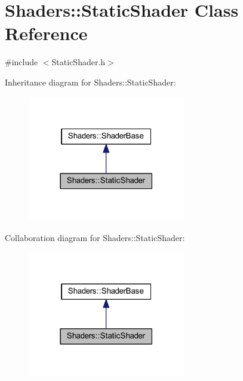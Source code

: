 \hypertarget{class_shaders_1_1_static_shader}{}\section{Shaders\+:\+:Static\+Shader Class Reference}
\label{class_shaders_1_1_static_shader}


{\ttfamily \#include $<$Static\+Shader.\+h$>$}



Inheritance diagram for Shaders\+:\+:Static\+Shader\+:
\nopagebreak
\begin{figure}[H]
\begin{center}
\leavevmode
\includegraphics[width=195pt]{class_shaders_1_1_static_shader__inherit__graph}
\end{center}
\end{figure}


Collaboration diagram for Shaders\+:\+:Static\+Shader\+:
\nopagebreak
\begin{figure}[H]
\begin{center}
\leavevmode
\includegraphics[width=195pt]{class_shaders_1_1_static_shader__coll__graph}
\end{center}
\end{figure}
